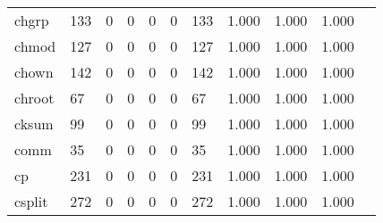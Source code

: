 \begin{longtable}{lp{1.10cm}p{1.10cm}p{1.10cm}p{1.10cm}p{1.10cm}p{1.10cm}p{1.10cm}p{1.10cm}p{1.10cm}p{1.10cm}}
chgrp     &                    133 &                                  0 &                                 0 &                                0 &                                 0 &                             133 &                          1.000 &                                 1.000 &                               1.000 \\
chmod     &                    127 &                                  0 &                                 0 &                                0 &                                 0 &                             127 &                          1.000 &                                 1.000 &                               1.000 \\
chown     &                    142 &                                  0 &                                 0 &                                0 &                                 0 &                             142 &                          1.000 &                                 1.000 &                               1.000 \\
chroot    &                     67 &                                  0 &                                 0 &                                0 &                                 0 &                              67 &                          1.000 &                                 1.000 &                               1.000 \\
cksum     &                     99 &                                  0 &                                 0 &                                0 &                                 0 &                              99 &                          1.000 &                                 1.000 &                               1.000 \\
comm      &                     35 &                                  0 &                                 0 &                                0 &                                 0 &                              35 &                          1.000 &                                 1.000 &                               1.000 \\
cp        &                    231 &                                  0 &                                 0 &                                0 &                                 0 &                             231 &                          1.000 &                                 1.000 &                               1.000 \\
csplit    &                    272 &                                  0 &                                 0 &                                0 &                                 0 &                             272 &                          1.000 &                                 1.000 &                               1.000 \\

\end{longtable}
